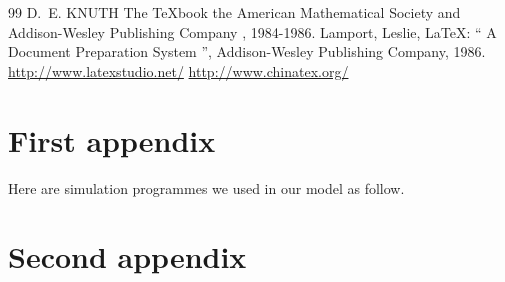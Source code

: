 \documentclass{mcmthesis}
\begin{document}
\begin{thebibliography} {99}
   D.~E. KNUTH   The \TeX{}book  the American
  Mathematical Society and Addison-Wesley
  Publishing Company , 1984-1986.
  Lamport, Leslie,  \LaTeX{}: `` A Document Preparation System '',
  Addison-Wesley Publishing Company, 1986.
  \url{http://www.latexstudio.net/}
  \url{http://www.chinatex.org/}
\end{thebibliography}

\begin{appendices}
  \section{First appendix}
  Here are simulation programmes we used in our model as follow.\\
  \section{Second appendix}
\end{appendices}
\end{document}
